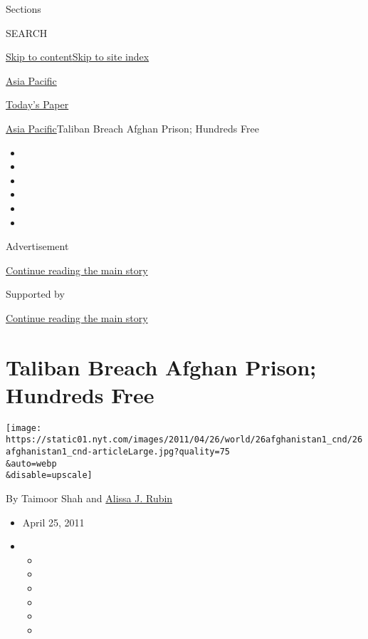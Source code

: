 Sections

SEARCH

\protect\hyperlink{site-content}{Skip to
content}\protect\hyperlink{site-index}{Skip to site index}

\href{https://www.nytimes.com/section/world/asia}{Asia Pacific}

\href{https://myaccount.nytimes.com/auth/login?response_type=cookie\&client_id=vi}{}

\href{https://www.nytimes.com/section/todayspaper}{Today's Paper}

\href{/section/world/asia}{Asia Pacific}\textbar{}Taliban Breach Afghan
Prison; Hundreds Free

\begin{itemize}
\item
\item
\item
\item
\item
\item
\end{itemize}

Advertisement

\protect\hyperlink{after-top}{Continue reading the main story}

Supported by

\protect\hyperlink{after-sponsor}{Continue reading the main story}

\hypertarget{taliban-breach-afghan-prison-hundreds-free}{%
\section{Taliban Breach Afghan Prison; Hundreds
Free}\label{taliban-breach-afghan-prison-hundreds-free}}

\texttt{[image: https://static01.nyt.com/images/2011/04/26/world/26afghanistan1\_cnd/26afghanistan1\_cnd-articleLarge.jpg?quality=75\\\&auto=webp\\\&disable=upscale]}

By Taimoor Shah and
\href{https://www.nytimes.com/by/alissa-j-rubin}{Alissa J. Rubin}

\begin{itemize}
\item
  April 25, 2011
\item
  \begin{itemize}
  \item
  \item
  \item
  \item
  \item
  \item
  \end{itemize}
\end{itemize}

